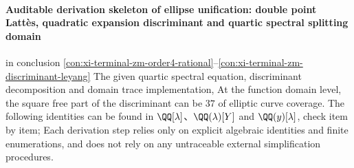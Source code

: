 
\paragraph{Auditable derivation skeleton of ellipse unification: double point Latt\`es, quadratic expansion discriminant and quartic spectral splitting domain}
in conclusion \ref{con:xi-terminal-zm-order4-rational}--\ref{con:xi-terminal-zm-discriminant-leyang} The given quartic spectral equation, discriminant decomposition and domain trace implementation,
At the function domain level, the square free part of the discriminant can be \(37\) of elliptic curve coverage.
The following identities can be found in \(\QQ[\lambda]\)、\(\QQ(\lambda)[Y]\) and \(\QQ(y)[\lambda]\), check item by item;
Each derivation step relies only on explicit algebraic identities and finite enumerations, and does not rely on any untraceable external simplification procedures.

